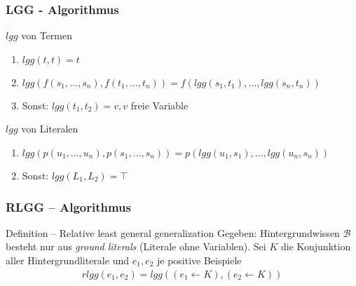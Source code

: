 \begin{frame}
\frametitle{LGG - Algorithmus}
	\begin{block}{$lgg$ von Termen}
		\begin{enumerate}
			\item $lgg(t,t) = t$\\
			\item $lgg(f(s_1, \ldots, s_n), f(t_1, \ldots, t_n)) = f(lgg(s_1, t_1), \ldots, lgg(s_n, t_n))$
			\item Sonst: $lgg(t_1, t_2) = v , v$ freie Variable
		\end{enumerate}
	\end{block}
	\begin{block}{$lgg$ von Literalen}
	\begin{enumerate}
		\item $lgg(p(u_1, \ldots, u_n), p(s_1, \ldots, s_n)) = p(lgg(u_1, s_1), \ldots, lgg(u_n, s_n))$\\
		\item Sonst: $lgg(L_1, L_2) = \top$
	\end{enumerate}
	\end{block}
\end{frame}


\begin{frame}
\frametitle{RLGG -- Algorithmus}
\begin{block}{Definition -- Relative least general generalization}
	Gegeben: Hintergrundwissen $\mathcal{B}$ besteht nur aus \emph{ground literals} (Literale ohne Variablen).
	Sei $K$ die Konjunktion aller Hintergrundliterale und $e_1, e_2$ je positive Beispiele
	\begin{align*}
		rlgg(e_1, e_2) = lgg((e_1 \leftarrow K), (e_2 \leftarrow K))
	\end{align*}
\end{block}

\end{frame}


